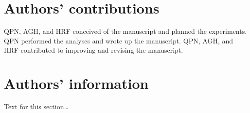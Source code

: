 \documentclass{bmcart}
\begin{document}
\begin{backmatter}
\section*{Authors' contributions}
QPN, AGH, and HRF conceived of the manuscript and planned the experiments. QPN performed the analyses and wrote up the manuscript. QPN, AGH, and HRF contributed to improving and revising the manuscript.  

\section*{Authors' information}%
Text for this section\ldots






\end{backmatter}
\end{document}
